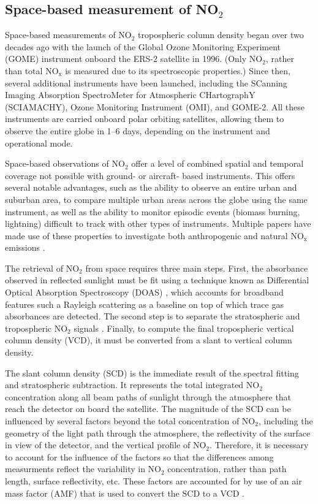 \documentclass[a4paper,10pt,oneside]{article}
\newcommand{\ce}[1]{$\mathrm{#1}$}
\begin{document}
\begin{sloppy}
\subsection{Space-based measurement of NO$_2$}

Space-based measurements of \ce{NO_2} tropospheric column density began over two decades ago with the launch of the Global Ozone Monitoring Experiment (GOME) instrument onboard the ERS-2 satellite in 1996. (Only \ce{NO_2}, rather than total \ce{NO_x} is measured due to its spectroscopic properties.) Since then, several additional instruments have been launched, including the SCanning Imaging Absorption SpectroMeter for Atmospheric CHartographY (SCIAMACHY), Ozone Monitoring Instrument (OMI), and GOME-2. All these instruments are carried onboard polar orbiting satellites, allowing them to observe the entire globe in 1--6 days, depending on the instrument and operational mode.

Space-based observations of \ce{NO_2} offer a level of combined spatial and temporal coverage not possible with ground- or aircraft- based instruments.  This offers several notable advantages, such as the ability to observe an entire urban and suburban area, to compare multiple urban areas across the globe using the same instrument, as well as the ability to monitor episodic events (biomass burning, lightning) difficult to track with other types of instruments.  Multiple papers have made use of these properties to investigate both anthropogenic \cite{ding15, lamsal15, tong15, huang14, vinken14, gu13, miyazaki12, russell12, lin10, kim09} and natural \ce{NO_x} emissions \cite{miyazaki14, beirle10, castellanos14, mebust14, mebust13, zorner16}.

The retrieval of \ce{NO_2} from space requires three main steps. First, the absorbance observed in reflected sunlight must be fit using a technique known as Differential Optical Absorption Spectroscopy (DOAS) \cite{burrows-platt-borrell}, which accounts for broadband features such a Rayleigh scattering as a baseline on top of which trace gas absorbances are detected. The second step is to separate the stratospheric and tropospheric \ce{NO_2} signals \cite{bucsela13}. Finally, to compute the final tropospheric vertical column density (VCD), it must be converted from a slant to vertical column density.

The slant column density (SCD) is the immediate result of the spectral fitting and stratospheric subtraction. It represents the total integrated \ce{NO_2} concentration along all beam paths of sunlight through the atmosphere that reach the detector on board the satellite.  The magnitude of the SCD can be influenced by several factors beyond the total concentration of \ce{NO_2}, including the geometry of the light path through the atmosphere, the reflectivity of the surface in view of the detector, and the vertical profile of \ce{NO_2}. Therefore, it is necessary to account for the influence of the factors so that the differences among measurments reflect the variability in \ce{NO_2} concentration, rather than path length, surface reflectivity, etc. These factors are accounted for by use of an air mass factor (AMF) that is used to convert the SCD to a VCD \cite{palmer01}. 


\end{sloppy}
\end{document}
